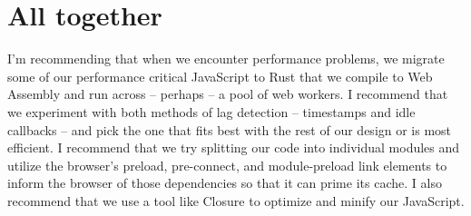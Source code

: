 \documentclass[draftclsnofoot,onecolumn]{IEEEtran}
\begin{document}
\section{All together}
I’m recommending that when we encounter performance problems, we migrate some of our performance critical JavaScript to Rust that we compile to Web Assembly and run across – perhaps – a pool of web workers.  I recommend that we experiment with both methods of lag detection – timestamps and idle callbacks – and pick the one that fits best with the rest of our design or is most efficient.  I recommend that we try splitting our code into individual modules and utilize the browser’s preload, pre-connect, and module-preload link elements to inform the browser of those dependencies so that it can prime its cache.  I also recommend that we use a tool like Closure to optimize and minify our JavaScript.


\end{document}
